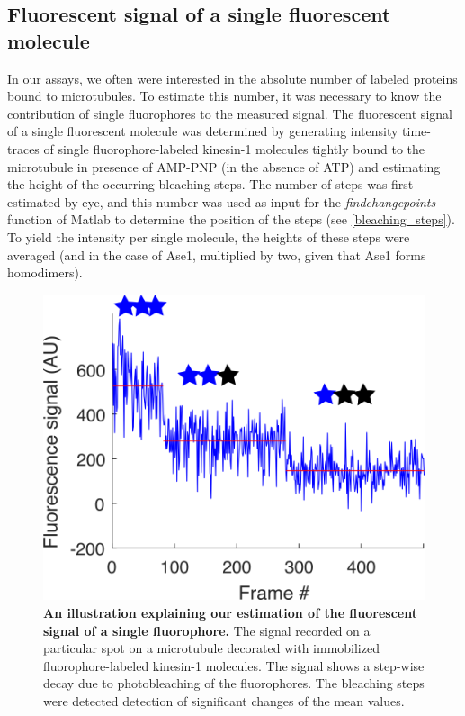 \subsection{Fluorescent signal of a single fluorescent molecule} 
In our assays, we often were interested in the absolute number of labeled proteins bound to microtubules. To estimate this number, it was necessary to know the contribution of single fluorophores to the measured signal. The fluorescent signal of a single fluorescent molecule was determined by generating intensity time-traces of single fluorophore-labeled kinesin-1 molecules tightly bound to the microtubule in presence of AMP-PNP (in the absence of ATP) and estimating the height of the occurring bleaching steps. The number of steps was first estimated by eye, and this number was used as input for the \textit{findchangepoints} function of Matlab to determine the position of the steps (see \autoref{bleaching_steps}). To yield the intensity per single molecule, the heights of these steps were averaged (and in the case of Ase1, multiplied by two, given that Ase1 forms homodimers).
\begin{figure}[htb]
\centering
\includegraphics[scale=1.1]{Figures/bleaching_steps.png}
\caption[An illustration explaining our estimation of the fluorescent signal of a single fluorophore.]{\textbf{An illustration explaining our estimation of the fluorescent signal of a single fluorophore.}
		The signal recorded on a particular spot on a microtubule decorated with immobilized fluorophore-labeled kinesin-1 molecules. The signal shows a step-wise decay due to photobleaching of the fluorophores. The bleaching steps were detected detection of significant changes of the mean values.
	}\label{bleaching_steps}
\end{figure}

